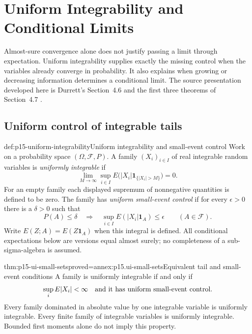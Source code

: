 \chapter{Uniform Integrability and Conditional Limits}
\label{sec:p15-uniform-integrability-and-conditional-limits}

Almost-sure convergence alone does not justify passing a limit through
expectation. Uniform integrability supplies exactly the missing control
when the variables already converge in probability. It also explains
when growing or decreasing information determines a conditional limit.
The source presentation developed here is Durrett's Section~4.6 and
the first three theorems of Section~4.7
\cite[pp.~244--250]{DurrettPTEAuthor2019}.

\section{Uniform control of integrable tails}
\label{sec:p15-ui-definitions}

\begin{hbdefinition}{def:p15-uniform-integrability}{Uniform integrability and small-event control}
Work on a probability space \((\Omega,\mathcal F,P)\).
A family \((X_i)_{i\in I}\) of real integrable random variables is
\emph{uniformly integrable} if
\[
       \lim_{M\to\infty}\sup_{i\in I}
                 E\bigl(|X_i|\mathbf1_{\{|X_i|>M\}}\bigr)=0.
\]
For an empty family each displayed supremum of nonnegative quantities
is defined to be zero. The family has \emph{uniform small-event control} if
for every \(\epsilon>0\) there is a \(\delta>0\) such that
\[
  P(A)\leq\delta\quad\Longrightarrow\quad
  \sup_{i\in I}E(|X_i|\mathbf1_A)\leq\epsilon
                 \qquad(A\in\mathcal F).
\]
Write \(E(Z;A)=E(Z\mathbf1_A)\) when this integral is defined.
All conditional expectations below are versions equal almost surely;
no completeness of a sub-sigma-algebra is assumed.
\end{hbdefinition}

\begin{hbtheorem}{thm:p15-ui-small-sets}{proved=annex:p15.ui-small-sets}{Equivalent tail and small-event conditions}
A family is uniformly integrable if and only if
\[
          \sup_i E|X_i|<\infty
       \quad\hbox{and it has uniform small-event control.}
\]
Every family dominated in absolute value by one integrable variable is
uniformly integrable. Every finite family of integrable variables is
uniformly integrable. Bounded first moments alone do not imply this property.
\end{hbtheorem}

